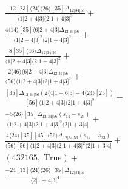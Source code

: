 \documentclass[varwidth, border=5pt]{standalone}
\begin{document}
\begin{my}
$\begin{gathered}
\scriptscriptstyle\frac{-12[23]⟨24⟩⟨26⟩[35]Δ_{12|34|56}}{⟨1|2+4|3]⟨2|1+4|3]^3}+\\
\scriptscriptstyle\frac{4⟨14⟩[35]⟨6|2+4|3]Δ_{12|34|56}}{⟨1|2+4|3]^2⟨2|1+4|3]^2}+\\
\scriptscriptstyle\frac{8[35]⟨46⟩Δ_{12|34|56}}{⟨1|2+4|3]⟨2|1+4|3]^2}+\\
\scriptscriptstyle\frac{2⟨46⟩⟨6|2+4|3]Δ_{12|34|56}}{⟨56⟩⟨1|2+4|3]⟨2|1+4|3]^2}+\\
\scriptscriptstyle\frac{[35]Δ_{12|34|56}(2⟨4|1+6|5]+4⟨24⟩[25])}{[56]⟨1|2+4|3]⟨2|1+4|3]^2}+\\
\scriptscriptstyle\frac{-5⟨26⟩[35]Δ_{12|34|56}(s_{14}-s_{23})}{⟨1|2+4|3]⟨2|1+4|3]^2⟨2|1+3|4]}+\\
\scriptscriptstyle\frac{4⟨24⟩[35][45]⟨56⟩Δ_{12|34|56}(s_{14}-s_{23})}{⟨56⟩[56]⟨1|2+4|3]⟨2|1+4|3]^2⟨2|1+3|4]}+\\
\scriptscriptstyle(432165,\;\text{True})+\\
\scriptscriptstyle\frac{-24[13]⟨24⟩⟨26⟩[35]Δ_{12|34|56}}{⟨2|1+4|3]^4}\phantom{+}
\end{gathered}$
\end{my}
\end{document}
